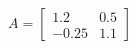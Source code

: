 \documentclass[preview]{standalone}
\begin{document}
\begin{align*}
A=\begin{bmatrix}1.2&0.5\\-0.25&1.1\end{bmatrix}
\end{align*}
\end{document}
